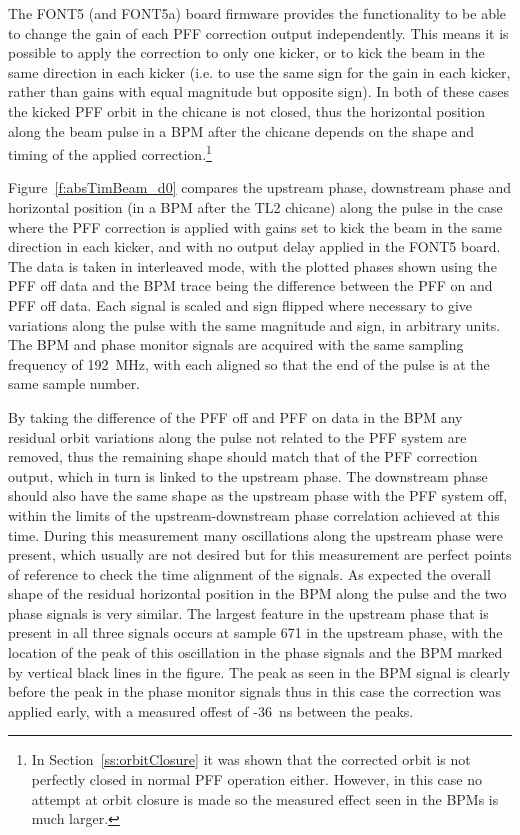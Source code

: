The FONT5 (and FONT5a) board firmware provides the functionality to be able to change the gain of each PFF correction output independently. This means it is possible to apply the correction to only one kicker, or to kick the beam in the same direction in each kicker (i.e. to use the same sign for the gain in each kicker, rather than gains with equal magnitude but opposite sign). In both of these cases the kicked PFF orbit in the chicane is not closed, thus the horizontal position along the beam pulse in a BPM after the chicane depends on the shape and timing of the applied correction.\footnote{In Section~\ref{ss:orbitClosure} it was shown that the corrected orbit is not perfectly closed in normal PFF operation either. However, in this case no attempt at orbit closure is made so the measured effect seen in the BPMs is much larger.}

Figure~\ref{f:absTimBeam_d0} compares the upstream phase, downstream phase and horizontal position (in a BPM after the TL2 chicane) along the pulse in the case where the PFF correction is applied with gains set to kick the beam in the same direction in each kicker, and with no output delay applied in the FONT5 board. The data is taken in interleaved mode, with the plotted phases shown using the PFF off data and the BPM trace being the difference between the PFF on and PFF off data. Each signal is scaled and sign flipped where necessary to give variations along the pulse with the same magnitude and sign, in arbitrary units. The BPM and phase monitor signals are acquired with the same sampling frequency of 192~MHz, with each aligned so that the end of the pulse is at the same sample number. 

By taking the difference of the PFF off and PFF on data in the BPM any residual orbit variations along the pulse not related to the PFF system are removed, thus the remaining shape should match that of the PFF correction output, which in turn is linked to the upstream phase. The downstream phase should also have the same shape as the upstream phase with the PFF system off, within the limits of the upstream-downstream phase correlation achieved at this time. During this measurement many oscillations along the upstream phase were present, which usually are not desired but for this measurement are perfect points of reference to check the time alignment of the signals. As expected the overall shape of the residual horizontal position in the BPM along the pulse and the two phase signals is very similar. The largest feature in the upstream phase that is present in all three signals occurs at sample 671 in the upstream phase, with the location of the peak of this oscillation in the phase signals and the BPM marked by vertical black lines in the figure. The peak as seen in the BPM signal is clearly before the peak in the phase monitor signals thus in this case the correction was applied early, with a measured offest of -36~ns between the peaks.

